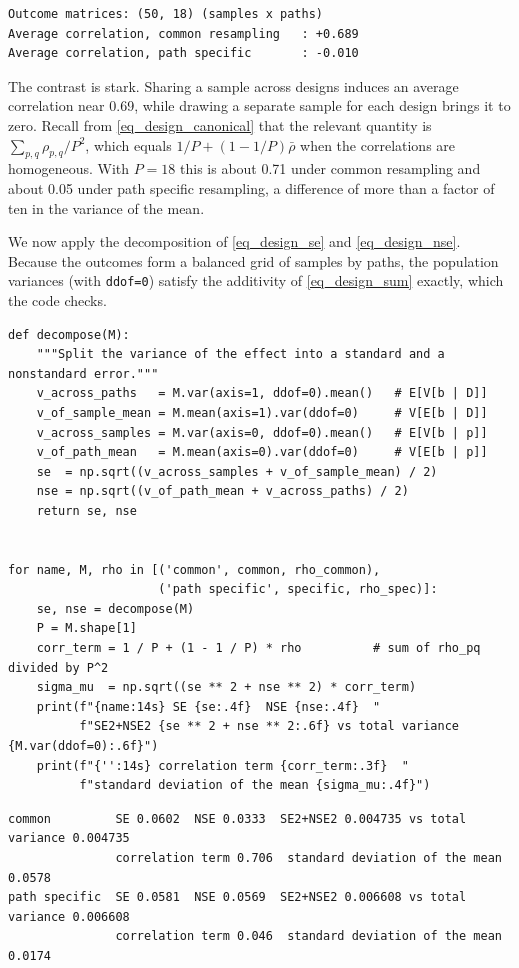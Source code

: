 \begin{verbatim}
Outcome matrices: (50, 18) (samples x paths)
Average correlation, common resampling   : +0.689
Average correlation, path specific       : -0.010
\end{verbatim}

The contrast is stark. Sharing a sample across designs induces an average correlation near 0.69, while drawing a separate sample for each design brings it to zero. Recall from \ref{eq_design_canonical} that the relevant quantity is $\sum_{p,q}\rho_{p,q}/P^2$, which equals $1/P + (1 - 1/P)\bar{\rho}$ when the correlations are homogeneous. With $P = 18$ this is about 0.71 under common resampling and about 0.05 under path specific resampling, a difference of more than a factor of ten in the variance of the mean.

We now apply the decomposition of \ref{eq_design_se} and \ref{eq_design_nse}. Because the outcomes form a balanced grid of samples by paths, the population variances (with \texttt{ddof=0}) satisfy the additivity of \ref{eq_design_sum} exactly, which the code checks.

\begin{verbatim}
def decompose(M):
    """Split the variance of the effect into a standard and a nonstandard error."""
    v_across_paths   = M.var(axis=1, ddof=0).mean()   # E[V[b | D]]
    v_of_sample_mean = M.mean(axis=1).var(ddof=0)     # V[E[b | D]]
    v_across_samples = M.var(axis=0, ddof=0).mean()   # E[V[b | p]]
    v_of_path_mean   = M.mean(axis=0).var(ddof=0)     # V[E[b | p]]
    se  = np.sqrt((v_across_samples + v_of_sample_mean) / 2)
    nse = np.sqrt((v_of_path_mean + v_across_paths) / 2)
    return se, nse


for name, M, rho in [('common', common, rho_common),
                     ('path specific', specific, rho_spec)]:
    se, nse = decompose(M)
    P = M.shape[1]
    corr_term = 1 / P + (1 - 1 / P) * rho          # sum of rho_pq divided by P^2
    sigma_mu  = np.sqrt((se ** 2 + nse ** 2) * corr_term)
    print(f"{name:14s} SE {se:.4f}  NSE {nse:.4f}  "
          f"SE2+NSE2 {se ** 2 + nse ** 2:.6f} vs total variance {M.var(ddof=0):.6f}")
    print(f"{'':14s} correlation term {corr_term:.3f}  "
          f"standard deviation of the mean {sigma_mu:.4f}")
\end{verbatim}

\begin{verbatim}
common         SE 0.0602  NSE 0.0333  SE2+NSE2 0.004735 vs total variance 0.004735
               correlation term 0.706  standard deviation of the mean 0.0578
path specific  SE 0.0581  NSE 0.0569  SE2+NSE2 0.006608 vs total variance 0.006608
               correlation term 0.046  standard deviation of the mean 0.0174
\end{verbatim}

